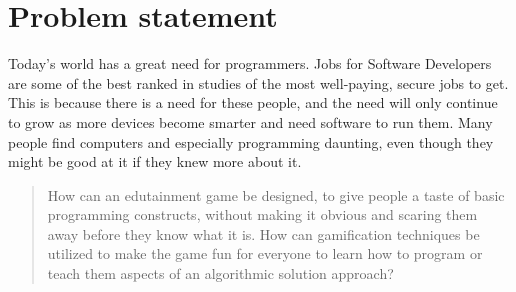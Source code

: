 \section{Problem statement}
\label{sec:problemstatement}

Today's world has a great need for programmers. Jobs for Software Developers are some of the best ranked in studies of the most well-paying, secure jobs to get. This is because there is a need for these people, and the need will only continue to grow as more devices become smarter and need software to run them.
Many people find computers and especially programming daunting, even though they might be good at it if they knew more about it.\newline

\begin{quotation}
	How can an edutainment game be designed, to give people a taste of basic programming constructs, without making it obvious and scaring them away before they know what it is. How can gamification techniques be utilized to make the game fun for everyone to learn how to program or teach them aspects of an algorithmic solution approach?
\end{quotation}
